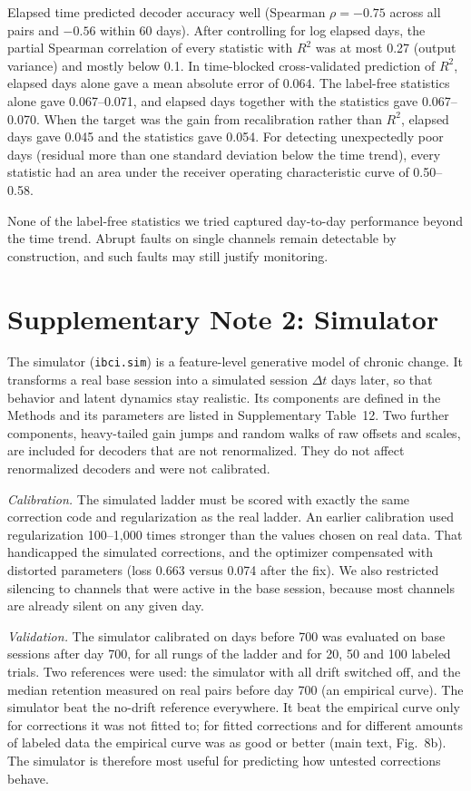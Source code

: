 \documentclass[pdflatex,sn-nature]{sn-jnl}
\begin{document}
Elapsed time predicted decoder accuracy well (Spearman $\rho = -0.75$ across all pairs and $-0.56$ within 60 days).
After controlling for log elapsed days, the partial Spearman correlation of every statistic with $R^2$ was at most
0.27 (output variance) and mostly below 0.1. In time-blocked cross-validated prediction of $R^2$, elapsed days alone
gave a mean absolute error of 0.064. The label-free statistics alone gave 0.067--0.071, and elapsed days together with
the statistics gave 0.067--0.070. When the target was the gain from recalibration rather than $R^2$, elapsed days gave
0.045 and the statistics gave 0.054. For detecting unexpectedly poor days (residual more than one standard deviation
below the time trend), every statistic had an area under the receiver operating characteristic curve of 0.50--0.58.

None of the label-free statistics we tried captured day-to-day performance beyond the time trend. Abrupt faults on
single channels remain detectable by construction, and such faults may still justify monitoring.

\section*{Supplementary Note 2: Simulator}

The simulator (\texttt{ibci.sim}) is a feature-level generative model of chronic change. It transforms a real base
session into a simulated session $\Delta t$ days later, so that behavior and latent dynamics stay realistic. Its
components are defined in the Methods and its parameters are listed in Supplementary Table~12. Two further components,
heavy-tailed gain jumps and random walks of raw offsets and scales, are included for decoders that are not
renormalized. They do not affect renormalized decoders and were not calibrated.

\textit{Calibration.} The simulated ladder must be scored with exactly the same correction code and regularization as
the real ladder. An earlier calibration used regularization 100--1,000 times stronger than the values chosen on real
data. That handicapped the simulated corrections, and the optimizer compensated with distorted parameters (loss 0.663
versus 0.074 after the fix). We also restricted silencing to channels that were active in the base session, because
most channels are already silent on any given day.

\textit{Validation.} The simulator calibrated on days before 700 was evaluated on base sessions after day 700, for
all rungs of the ladder and for 20, 50 and 100 labeled trials. Two references were used: the simulator with all drift
switched off, and the median retention measured on real pairs before day 700 (an empirical curve). The simulator
beat the no-drift reference everywhere. It beat the empirical curve only for corrections it was not fitted to; for
fitted corrections and for different amounts of labeled data the empirical curve was as good or better (main text,
Fig.~8b). The simulator is therefore most useful for predicting how untested corrections behave.
\end{document}
